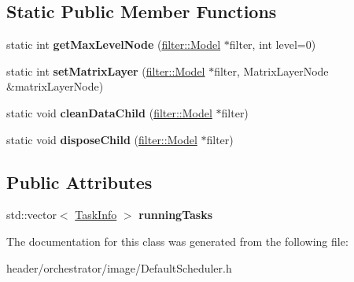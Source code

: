 \subsection*{Static Public Member Functions}
\begin{DoxyCompactItemize}
\item 
\mbox{\label{classorchestrator_1_1image_1_1_default_scheduler_aff1a90d0a46fc1a7dfab983a34d273fb}} 
static int {\bfseries get\+Max\+Level\+Node} (\hyperlink{classfilter_1_1_model}{filter\+::\+Model} $\ast$filter, int level=0)
\item 
\mbox{\label{classorchestrator_1_1image_1_1_default_scheduler_a09d8b17733aabc9916483815df482a09}} 
static int {\bfseries set\+Matrix\+Layer} (\hyperlink{classfilter_1_1_model}{filter\+::\+Model} $\ast$filter, Matrix\+Layer\+Node \&matrix\+Layer\+Node)
\item 
\mbox{\label{classorchestrator_1_1image_1_1_default_scheduler_ac0a1cc8c42f8d8ddd2753981058ba5ce}} 
static void {\bfseries clean\+Data\+Child} (\hyperlink{classfilter_1_1_model}{filter\+::\+Model} $\ast$filter)
\item 
\mbox{\label{classorchestrator_1_1image_1_1_default_scheduler_a32a61ca9287fb07762810989a4fc316f}} 
static void {\bfseries dispose\+Child} (\hyperlink{classfilter_1_1_model}{filter\+::\+Model} $\ast$filter)
\end{DoxyCompactItemize}
\subsection*{Public Attributes}
\begin{DoxyCompactItemize}
\item 
\mbox{\label{classorchestrator_1_1image_1_1_default_scheduler_ad14f430cc24d129353b21c7df3e28ceb}} 
std\+::vector$<$ \hyperlink{classorchestrator_1_1_task_info}{Task\+Info} $>$ {\bfseries running\+Tasks}
\end{DoxyCompactItemize}


The documentation for this class was generated from the following file\+:\begin{DoxyCompactItemize}
\item 
header/orchestrator/image/Default\+Scheduler.\+h\end{DoxyCompactItemize}
